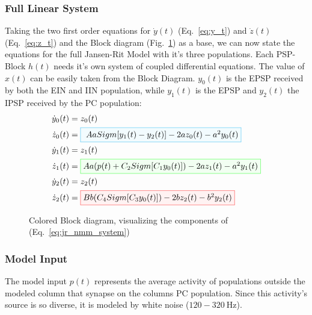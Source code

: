 \subsubsection{Full Linear System}

Taking the two first order equations for $\dot{y}(t)$ (Eq.~\ref{eq:y_t}) and $\dot{z}(t)$ (Eq.~\ref{eq:z_t})
and the Block diagram (Fig.~\ref{fig:JRBlockColored}) as a base,
we can now state the equations for the full Jansen-Rit Model with it's three populations.
Each PSP-Block $h(t)$ needs it's own system of coupled differential equations.
The value of $x(t)$ can be easily taken from the Block Diagram. $y_0(t)$ is the EPSP received by
both the EIN and IIN population, while $y_1(t)$ is the EPSP and $y_2(t)$ the IPSP received by the PC population:
\begin{equation}
    \begin{aligned}
        \dot{y}_0(t) &= z_0(t) \\
        \dot{z}_0(t) &= \fcolorbox{cyan!80}{cyan!5}{ $ Aa Sigm[y_1(t) - y_2(t)] - 2az_0(t) - a^{2}y_0(t) $}\\
        \dot{y}_1(t) &= z_1(t) \\
        \dot{z}_1(t) &= \fcolorbox{green!80}{green!5}{$ Aa(p(t) + C_{2}Sigm[C_{1}y_0(t)]) - 2az_1(t) - a^{2}y_1(t)$}\\
        \dot{y}_2(t) &= z_2(t) \\
        \dot{z}_2(t) &= \fcolorbox{red!80}{red!5}{$ Bb(C_{4}Sigm[C_{3}y_0(t)]) - 2bz_2(t) -b^{2}y_2(t)$} \\
    \end{aligned}\label{eq:jr_nmm_system}
\end{equation}

\begin{figure}[H]
    \centering
    
    \caption{Colored Block diagram, visualizing the components of (Eq.~\ref{eq:jr_nmm_system})}
    \label{fig:JRBlockColored}
\end{figure}

\subsubsection{Model Input}

The model input $p(t)$ represents the average activity of populations outside the modeled
column that synapse on the columns PC population.
Since this activity's source is so diverse, it is modeled by white noise ($120-\SI{320}{\hertz}$).

